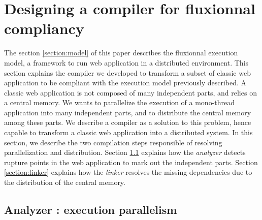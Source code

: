 \section{Designing a compiler for fluxionnal compliancy} \label{section:compiler}

The section \ref{section:model} of this paper describes the fluxionnal execution model, a framework to run web application in a distributed environment.
This section explains the compiler we developed to transform a subset of classic web application to be compliant with the execution model previously described.
A classic web application is not composed of many independent parts, and relies on a central memory.
We wants to parallelize the execution of a mono-thread application into many independent parts, and to distribute the central memory among these parts.
We describe a compiler as a solution to this problem, hence capable to transform a classic web application into a distributed system.
In this section, we describe the two compilation steps responsible of resolving parallelization and distribution.
Section \ref{section:analyzer} explains how the \textit{analyzer} detects rupture points in the web application to mark out the independent parts.
Section \ref{section:linker} explains how the \textit{linker} resolves the missing dependencies due to the distribution of the central memory.


\subsection{Analyzer : execution parallelism} \label{section:analyzer}

